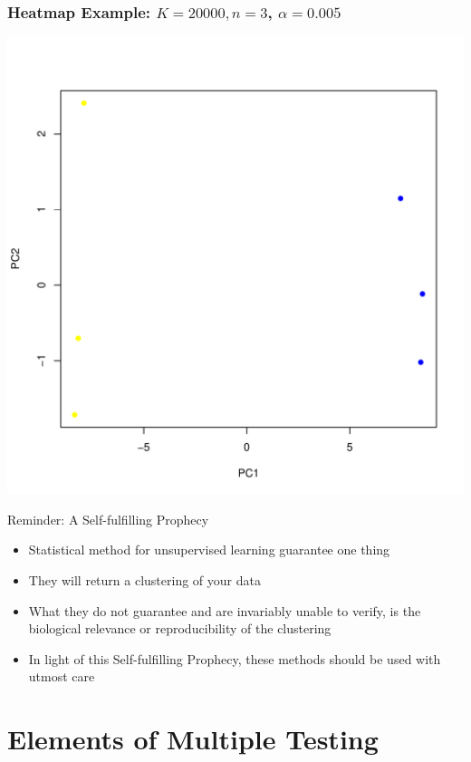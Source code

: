 \documentclass[xcolor=x11names,compress]{beamer}\usepackage[]{graphicx}\usepackage[]{color}
\newenvironment{knitrout}{}{} %
\begin{document}
\begin{frame}[containsverbatim]
  \frametitle{Heatmap Example: $K=20000, n=3$, $\alpha=0.005$}

\begin{knitrout}\tiny
{}\color{fgcolor}

{\centering \includegraphics[width=.5\linewidth]{figure/beamer-pc3-1} 

}



\end{knitrout}








\end{frame}



\begin{frame}{Reminder: A Self-fulfilling Prophecy}
  \begin{itemize}
  \item Statistical method for unsupervised learning guarantee one thing
  \item They will return a clustering of your data
  \item What they do not guarantee and are invariably unable to 
        verify, is the biological relevance or reproducibility of the clustering
  \item In light of this Self-fulfilling Prophecy, these methods should be used
      with utmost care
  \end{itemize}
\end{frame}



\section[Multiple Testing]{Elements of Multiple Testing}
\end{document}
